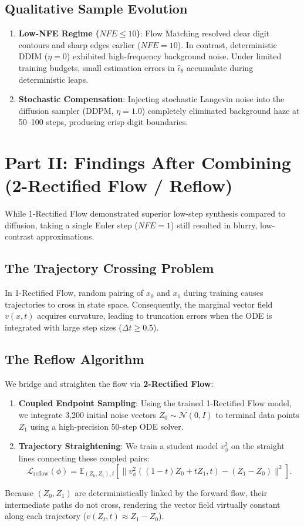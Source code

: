 \documentclass[11pt,a4paper]{article}
\begin{document}
\subsection{Qualitative Sample Evolution}
\begin{enumerate}
    \item \textbf{Low-NFE Regime ($NFE \le 10$)}: Flow Matching resolved clear digit contours and sharp edges earlier ($NFE=10$). In contrast, deterministic DDIM ($\eta=0$) exhibited high-frequency background noise. Under limited training budgets, small estimation errors in $\hat{\epsilon}_\theta$ accumulate during deterministic leaps.
    \item \textbf{Stochastic Compensation}: Injecting stochastic Langevin noise into the diffusion sampler (DDPM, $\eta=1.0$) completely eliminated background haze at 50--100 steps, producing crisp digit boundaries.
\end{enumerate}

\section{Part II: Findings After Combining (2-Rectified Flow / Reflow)}

While 1-Rectified Flow demonstrated superior low-step synthesis compared to diffusion, taking a single Euler step ($NFE=1$) still resulted in blurry, low-contrast approximations.

\subsection{The Trajectory Crossing Problem}
In 1-Rectified Flow, random pairing of $x_0$ and $x_1$ during training causes trajectories to cross in state space. Consequently, the marginal vector field $v(x, t)$ acquires curvature, leading to truncation errors when the ODE is integrated with large step sizes ($\Delta t \ge 0.5$).

\subsection{The Reflow Algorithm}
We bridge and straighten the flow via \textbf{2-Rectified Flow}:
\begin{enumerate}
    \item \textbf{Coupled Endpoint Sampling}: Using the trained 1-Rectified Flow model, we integrate 3,200 initial noise vectors $Z_0 \sim \mathcal{N}(0, I)$ to terminal data points $Z_1$ using a high-precision 50-step ODE solver.
    \item \textbf{Trajectory Straightening}: We train a student model $v^2_\phi$ on the straight lines connecting these coupled pairs:
    \begin{equation}
        \mathcal{L}_{\text{reflow}}(\phi) = \mathbb{E}_{(Z_0, Z_1), t} \left[ \| v^2_\phi((1-t)Z_0 + t Z_1, t) - (Z_1 - Z_0) \|^2 \right].
    \end{equation}
\end{enumerate}
Because $(Z_0, Z_1)$ are deterministically linked by the forward flow, their intermediate paths do not cross, rendering the vector field virtually constant along each trajectory ($v(Z_t, t) \approx Z_1 - Z_0$).
\end{document}
